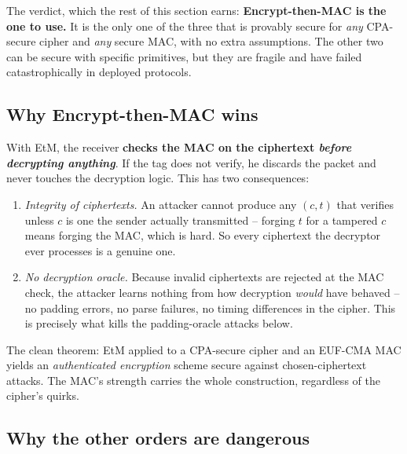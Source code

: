 \begin{focusbox}
The verdict, which the rest of this section earns: \textbf{Encrypt-then-MAC is the one to use.} It is the only one of the three that is provably secure for \emph{any} CPA-secure cipher and \emph{any} secure MAC, with no extra assumptions. The other two can be secure with specific primitives, but they are fragile and have failed catastrophically in deployed protocols.
\end{focusbox}

\subsection{Why Encrypt-then-MAC wins}

\begin{whybox}
With EtM, the receiver \textbf{checks the MAC on the ciphertext \emph{before decrypting anything}}. If the tag does not verify, he discards the packet and never touches the decryption logic. This has two consequences:
\begin{enumerate}
  \item \emph{Integrity of ciphertexts.} An attacker cannot produce any $(c,t)$ that verifies unless $c$ is one the sender actually transmitted -- forging $t$ for a tampered $c$ means forging the MAC, which is hard. So every ciphertext the decryptor ever processes is a genuine one.
  \item \emph{No decryption oracle.} Because invalid ciphertexts are rejected at the MAC check, the attacker learns nothing from how decryption \emph{would} have behaved -- no padding errors, no parse failures, no timing differences in the cipher. This is precisely what kills the padding-oracle attacks below.
\end{enumerate}
The clean theorem: EtM applied to a CPA-secure cipher and an EUF-CMA MAC yields an \emph{authenticated encryption} scheme secure against chosen-ciphertext attacks. The MAC's strength carries the whole construction, regardless of the cipher's quirks.
\end{whybox}

\subsection{Why the other orders are dangerous}

